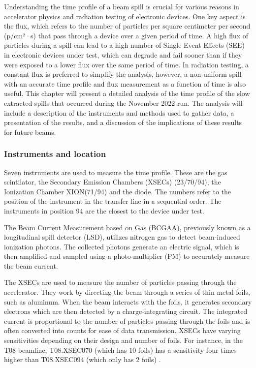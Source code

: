 Understanding the time profile of a beam spill is crucial for various reasons in accelerator physics and radiation testing of electronic devices. One key aspect is the flux, which refers to the number of particles per square centimeter per second (p/cm²·s) that pass through a device over a given period of time. A high flux of particles during a spill can lead to a high number of Single Event Effects (SEE) in electronic devices under test, which can degrade and fail sooner than if they were exposed to a lower flux over the same period of time. In radiation testing, a constant flux is preferred to simplify the analysis, however, a non-uniform spill with an accurate time profile and flux measurement as a function of time is also useful. This chapter will present a detailed analysis of the time profile of the slow extracted spills that occurred during the November 2022 run. The analysis will include a description of the instruments and methods used to gather data, a presentation of the results, and a discussion of the implications of these results for future beams.

\subsubsection{Instruments and location}

Seven instruments are used to measure the time profile. These are the gas scintilator, the Secondary Emission Chambers (XSECs) (23/70/94), the Ionization Chamber XION(71/94) and the diode. The numbers refer to the position of the instrument in the transfer line in a sequential order. The instruments in position 94 are the closest to the device under test.

The Beam Current Measurement based on Gas (BCGAA), previously known as a longitudinal spill detector (LSD), utilizes nitrogen gas to detect beam-induced ionization photons. The collected photons generate an electric signal, which is then amplified and sampled using a photo-multiplier (PM) to accurately measure the beam current.

The XSECs are used to measure the number of particles passing through the accelerator. They work by directing the beam through a series of thin metal foils, such as aluminum. When the beam interacts with the foils, it generates secondary electrons which are then detected by a charge-integrating circuit. The integrated current is proportional to the number of particles passing through the foils and is often converted into counts for ease of data transmission. XSECs have varying sensitivities depending on their design and number of foils. For instance, in the T08 beamline, T08.XSEC070 (which has 10 foils) has a sensitivity four times higher than T08.XSEC094 (which only has 2 foils) \cite{ravotti_calibration_2022}.

